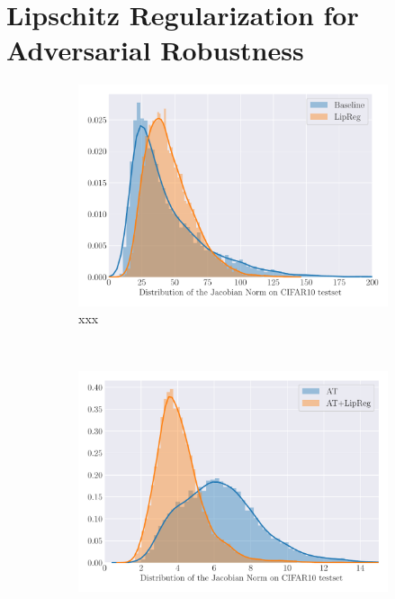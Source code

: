 \section{Lipschitz Regularization for Adversarial Robustness}
\label{section:ch5-lipschitz_regularization_for_adversarial_robustness}


\begin{figure}[h]
   \centering
   \begin{subfigure}[b]{\textwidth}
     \centering
     \includegraphics[width=\scalefigure\textwidth]{figures/main/ch5-lipschitz_regularization/jacobian_distribution_v1.pdf}
     \caption{xxx}
     \label{figure:ch5-jacobian_distribution_v1}
   \end{subfigure}
   \\[2cm]
   \begin{subfigure}[b]{\textwidth}
      \centering
      \includegraphics[width=\scalefigure\textwidth]{figures/main/ch5-lipschitz_regularization/jacobian_distribution_v2.pdf}

\end{subfigure}
\end{figure}
